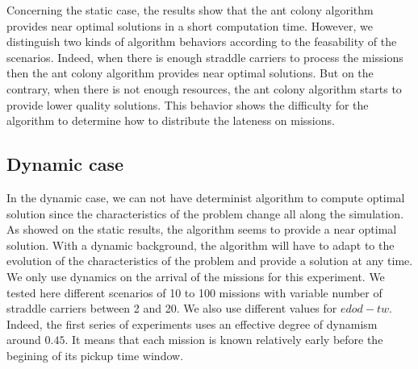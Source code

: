 \documentclass[a4paper,10pt]{article}
\begin{document}
  Concerning the static case, the results show that the ant colony algorithm provides near optimal solutions in a short computation time. However, we distinguish two kinds of algorithm behaviors according to the feasability of the scenarios. Indeed, when there is enough straddle carriers to process the missions then the ant colony algorithm provides near optimal solutions. But on the contrary, when there is not enough resources, the ant colony algorithm starts to provide lower quality solutions. This behavior shows the difficulty for the algorithm to determine how to distribute the lateness on missions.

	\subsection{Dynamic case}
  In the dynamic case, we can not have determinist algorithm to compute optimal solution since the characteristics of the problem change all along the simulation. As showed on the static results, the algorithm seems to provide a near optimal solution. With a dynamic background, the algorithm will have to adapt to the evolution of the characteristics of the problem and provide a solution at any time.\\

  We only use dynamics on the arrival of the missions for this experiment. We tested here different scenarios of 10 to 100 missions with variable number of straddle carriers between 2 and 20. We also use different values for $edod-tw$. Indeed, the first series of experiments uses an effective degree of dynamism around $0.45$. It means that each mission is known relatively early before the begining of its pickup time window.
\end{document}
